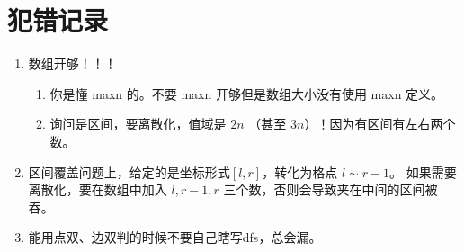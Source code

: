 \documentclass[../template.tex]{subfiles}
\begin{document}
\section{犯错记录}
\begin{enumerate}
	\item 数组开够！！！
	      \begin{enumerate}
		      \item 你是懂 maxn 的。不要 maxn 开够但是数组大小没有使用 maxn 定义。
		      \item 询问是区间，要离散化，值域是 $2n$ （甚至 $3n$）！因为有区间有左右两个数。
	      \end{enumerate}

	\item 区间覆盖问题上，给定的是坐标形式$[l,r]$，转化为格点 $l\sim r-1$。
	      如果需要离散化，要在数组中加入 $l,r-1,r$ 三个数，否则会导致夹在中间的区间被吞。

	\item 能用点双、边双判的时候不要自己瞎写dfs，总会漏。

\end{enumerate}
\end{document}
